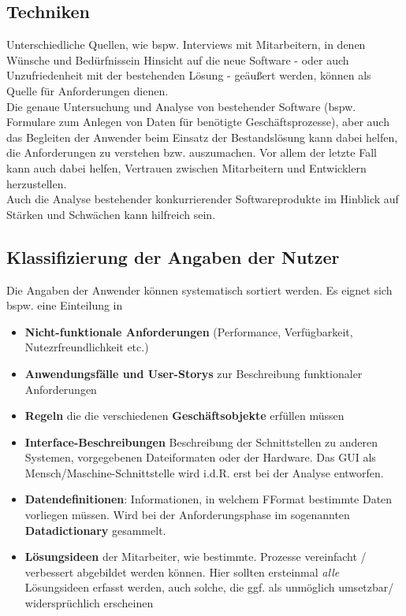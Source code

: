 \subsection*{Techniken}
Unterschiedliche Quellen, wie bspw. Interviews mit Mitarbeitern, in denen Wünsche und Bedürfnissein Hinsicht auf die neue Software - oder auch Unzufriedenheit mit der bestehenden Lösung - geäußert werden, können als Quelle für Anforderungen dienen.\\

\noindent
Die genaue Untersuchung und Analyse von bestehender Software (bspw. Formulare zum Anlegen von Daten für benötigte Geschäftsprozesse), aber auch das Begleiten der Anwender beim Einsatz der Bestandslösung kann dabei helfen, die Anforderungen zu verstehen bzw. auszumachen.
Vor allem der letzte Fall kann auch dabei helfen, Vertrauen zwischen Mitarbeitern und Entwicklern herzustellen.\\

\noindent
Auch die Analyse bestehender konkurrierender Softwareprodukte im Hinblick auf Stärken und Schwächen kann hilfreich sein.

\subsection*{Klassifizierung der Angaben der Nutzer}
Die Angaben der Anwender können systematisch sortiert werden.
Es eignet sich bspw. eine Einteilung in

\begin{itemize}
    \item \textbf{Nicht-funktionale Anforderungen} (Performance, Verfügbarkeit, Nutezrfreundlichkeit etc.)
    \item \textbf{Anwendungsfälle und User-Storys} zur Beschreibung funktionaler Anforderungen
    \item \textbf{Regeln} die die verschiedenen \textbf{Geschäftsobjekte} erfüllen müssen
    \item \textbf{Interface-Beschreibungen} Beschreibung der Schnittstellen zu anderen Systemen, vorgegebenen Dateiformaten oder der Hardware.
    Das GUI als Mensch/Maschine-Schnittstelle wird i.d.R. erst bei der Analyse entworfen.
    \item \textbf{Datendefinitionen}: Informationen, in welchem FFormat bestimmte Daten vorliegen müssen.
    Wird bei der Anforderungsphase im sogenannten \textbf{Datadictionary} gesammelt.
    \item \textbf{Lösungsideen} der Mitarbeiter, wie bestimmte. Prozesse vereinfacht / verbessert abgebildet werden können.
    Hier sollten ersteinmal \textit{alle} Lösungsideen erfasst werden, auch solche, die ggf. als unmöglich umsetzbar/ widersprüchlich erscheinen
\end{itemize}

